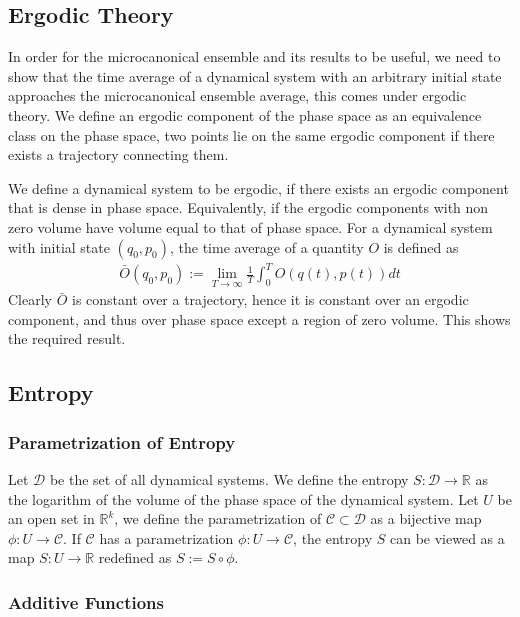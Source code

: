 \documentclass{article}
\begin{document}
\subsection{Ergodic Theory}

In order for the microcanonical ensemble and its results to be useful, we need to show that the time average of a dynamical system with an arbitrary initial state
approaches the microcanonical ensemble average, this comes under ergodic theory.
We define an ergodic component of the phase space as an equivalence class on the phase space,
two points lie on the same ergodic component if there exists a trajectory connecting them.

We define a dynamical system to be ergodic, if there exists an ergodic component that is dense in phase space.
Equivalently, if the ergodic components with non zero volume have volume equal to that of phase space.
For a dynamical system with initial state $(q_0, p_0)$, the time average of a quantity $O$ is defined as
\begin{align*}
    \bar{O}(q_0, p_0) := \lim_{T \to \infty} \frac{1}{T} \int_0^T O(q(t), p(t)) dt
\end{align*}
Clearly $\bar{O}$ is constant over a trajectory, hence it is constant over an ergodic component, and thus over phase space except a region of zero volume.
This shows the required result.

\subsection{Entropy}

\subsubsection{Parametrization of Entropy}

Let $\mathcal{D}$ be the set of all dynamical systems.
We define the entropy $S: \mathcal{D} \to \mathbb{R}$ as the logarithm of the volume of the phase space of the dynamical system.
Let $U$ be an open set in $\mathbb{R}^k$, we define the parametrization of $\mathcal{C} \subset \mathcal{D}$ as a bijective map $\phi: U \to \mathcal{C}$.
If $\mathcal{C}$ has a parametrization $\phi: U \to \mathcal{C}$, the entropy $S$ can be viewed as a map $S: U \to \mathbb{R}$ redefined as $S := S \circ \phi$.

\subsubsection{Additive Functions}
\end{document}
